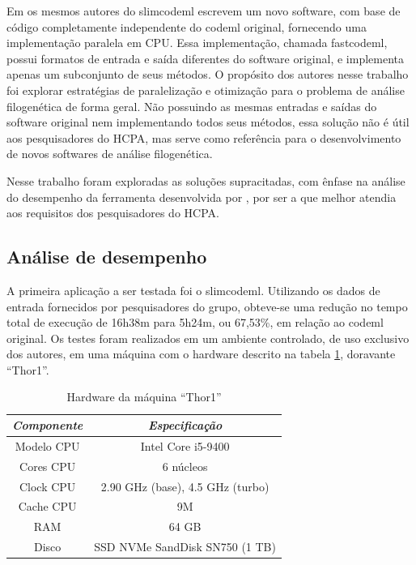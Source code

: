 \documentclass[cic,tc]{iiufrgs}
\begin{document}
Em \cite{valle2014optimization} os mesmos autores do slimcodeml escrevem um
novo software, com base de código completamente independente do codeml
original, fornecendo uma implementação paralela em CPU. Essa implementação,
chamada fastcodeml, possui formatos de entrada e saída diferentes do software
original, e implementa apenas um subconjunto de seus métodos. O propósito dos
autores nesse trabalho foi explorar estratégias de paralelização e otimização
para o problema de análise filogenética de forma geral. Não possuindo as mesmas
entradas e saídas do software original nem implementando todos seus métodos,
essa solução não é útil aos pesquisadores do HCPA, mas serve como referência
para o desenvolvimento de novos softwares de análise filogenética.

Nesse trabalho foram exploradas as soluções supracitadas, com ênfase na análise
do desempenho da ferramenta desenvolvida por \cite{schabauer2012slimcodeml},
por ser a que melhor atendia aos requisitos dos pesquisadores do HCPA.

\subsection{Análise de desempenho}

A primeira aplicação a ser testada foi o
slimcodeml.\cite{schabauer2012slimcodeml} Utilizando os dados de entrada
fornecidos por pesquisadores do grupo, obteve-se uma redução no tempo total de
execução de 16h38m para 5h24m, ou 67,53\%, em relação ao codeml original. Os
testes foram realizados em um ambiente controlado, de uso exclusivo dos
autores, em uma máquina com o hardware descrito na tabela \ref{tbl:thor1},
doravante ``Thor1''.

\begin{table}[h]
    \caption{Hardware da máquina ``Thor1''}
    \centering
        \begin{tabular}{c|c}
          \hline
          \textit{Componente}  &   \textit{Especificação} \\
          \hline
          \hline
          Modelo CPU & Intel Core i5-9400 \\
          Cores CPU & 6 núcleos\\
          Clock CPU & 2.90 GHz (base), 4.5 GHz (turbo) \\
          Cache CPU & 9M \\
          RAM & 64 GB \\
          Disco & SSD NVMe SandDisk SN750 (1 TB) \\
          \hline
        \end{tabular}
    \label{tbl:thor1}
\end{table}
\end{document}
